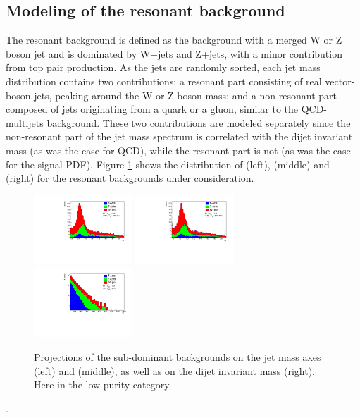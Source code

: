 \clearpage


\subsection{Modeling of the resonant background}
\label{sec:resbkgd}
The resonant background is defined as the background with a merged W or Z boson jet and is dominated by W+jets and Z+jets, with a minor contribution from top pair production. As the jets are randomly sorted, each jet mass distribution contains two contributions: a resonant part consisting of real vector-boson jets, peaking around the W or Z boson mass; and a non-resonant part composed of jets originating from a quark or a gluon, similar to the QCD-multijets background. These two contributions are modeled separately since the non-resonant part of the jet mass spectrum is correlated with the dijet invariant mass (as was the case for QCD), while the resonant part is not (as was the case for the signal PDF). Figure \ref{fig:stack_res_bkg} shows the distribution of \MJO (left), \MJT (middle) and \MVV (right) for the resonant backgrounds under consideration.
\begin{figure}[h!]
 \includegraphics[width=0.329\textwidth]{figures/analysis/search3/AN-17-303/resonantBkg/CP_background_px_xrange55-215_yrange55-215zrange1126-5000_HPLP.pdf}
 \includegraphics[width=0.329\textwidth]{figures/analysis/search3/AN-17-303/resonantBkg/CP_background_py_xrange55-215_yrange55-215zrange1126-5000_HPLP.pdf}
 \includegraphics[width=0.329\textwidth]{figures/analysis/search3/AN-17-303/resonantBkg/CP_background_pz_xrange55-215_yrange55-215zrange1126-5000_HPLP.pdf}
\caption{Projections of the sub-dominant backgrounds on the jet mass axes \MJO (left) and \MJT (middle), as well as on the dijet invariant mass \MVV (right). Here in the low-purity category.}
\label{fig:stack_res_bkg}
\end{figure}.

